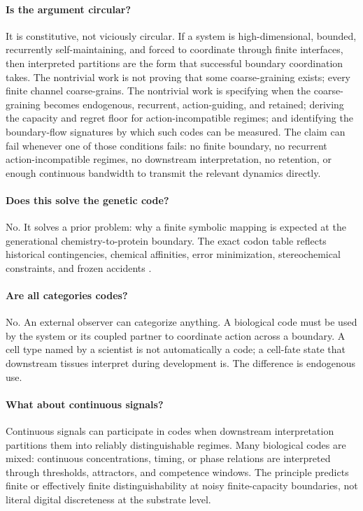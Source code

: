 \documentclass[12pt]{article}
\theoremstyle{definition}
\begin{document}
\paragraph{Is the argument circular?} It is constitutive, not viciously circular. If a system is high-dimensional, bounded, recurrently self-maintaining, and forced to coordinate through finite interfaces, then interpreted partitions are the form that successful boundary coordination takes. The nontrivial work is not proving that some coarse-graining exists; every finite channel coarse-grains. The nontrivial work is specifying when the coarse-graining becomes endogenous, recurrent, action-guiding, and retained; deriving the capacity and regret floor for action-incompatible regimes; and identifying the boundary-flow signatures by which such codes can be measured. The claim can fail whenever one of those conditions fails: no finite boundary, no recurrent action-incompatible regimes, no downstream interpretation, no retention, or enough continuous bandwidth to transmit the relevant dynamics directly.

\paragraph{Does this solve the genetic code?} No. It solves a prior problem: why a finite symbolic mapping is expected at the generational chemistry-to-protein boundary. The exact codon table reflects historical contingencies, chemical affinities, error minimization, stereochemical constraints, and frozen accidents \citep{crick1968,maynardsmith1995}.

\paragraph{Are all categories codes?} No. An external observer can categorize anything. A biological code must be used by the system or its coupled partner to coordinate action across a boundary. A cell type named by a scientist is not automatically a code; a cell-fate state that downstream tissues interpret during development is. The difference is endogenous use.

\paragraph{What about continuous signals?} Continuous signals can participate in codes when downstream interpretation partitions them into reliably distinguishable regimes. Many biological codes are mixed: continuous concentrations, timing, or phase relations are interpreted through thresholds, attractors, and competence windows. The principle predicts finite or effectively finite distinguishability at noisy finite-capacity boundaries, not literal digital discreteness at the substrate level.
\end{document}
